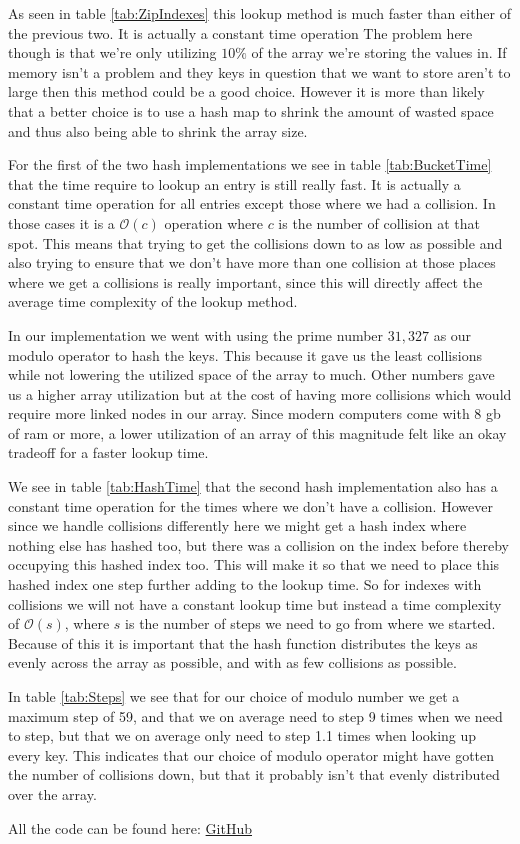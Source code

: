 \documentclass[a4paper,11pt]{article}
\begin{document}
As seen in table \ref{tab:ZipIndexes} this lookup method is much faster than either of the previous two. It is actually a constant time operation The problem here
though is that we're only utilizing $10\%$ of the array we're storing the values in. If memory isn't a problem and they keys in question that we want to store
aren't to large then this method could be a good choice. However it is more than likely that a better choice is to use a hash map to shrink the amount of wasted
space and thus also being able to shrink the array size.

For the first of the two hash implementations we see in table \ref{tab:BucketTime} that the time require to lookup an entry is still really fast. It is actually
a constant time operation for all entries except those where we had a collision. In those cases it is a $\mathcal{O}(c)$ operation where $c$ is the number of
collision at that spot. This means that trying to get the collisions down to as low as possible and also trying to ensure that we don't have more than one collision
at those places where we get a collisions is really important, since this will directly affect the average time complexity of the lookup method.

In our implementation we went with using the prime number $31,327$ as our modulo operator to hash the keys. This because it gave us the least collisions while not
lowering the utilized space of the array to much. Other numbers gave us a higher array utilization but at the cost of having more collisions which would require
more linked nodes in our array. Since modern computers come with 8 gb of ram or more, a lower utilization of an array of this magnitude felt like an okay tradeoff
for a faster lookup time.

We see in table \ref{tab:HashTime} that the second hash implementation also has a constant time operation for the times where we don't have a collision. However since we
handle collisions differently here we might get a hash index where nothing else has hashed too, but there was a collision on the index before thereby occupying this hashed index
too. This will make it so that we need to place this hashed index one step further adding to the lookup time. So for indexes with collisions we will not have a constant lookup
time but instead a time complexity of $\mathcal{O}(s)$, where $s$ is the number of steps we need to go from where we started. Because of this it is important that the hash
function distributes the keys as evenly across the array as possible, and with as few collisions as possible.

In table \ref{tab:Steps} we see that for our choice of modulo number we get a maximum step of 59, and that we on average need to step 9 times when we need to step, but that we
on average only need to step 1.1 times when looking up every key. This indicates that our choice of modulo operator might have gotten the number of collisions down, but that it
probably isn't that evenly distributed over the array.

All the code can be found here: \href{https://github.com/adrian-jonsson-sjoedin/ID1021-AlgoData/tree/main/Tasks/Hash/src}{GitHub}
\end{document}
